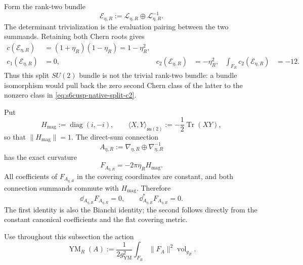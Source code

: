 Form the rank-two bundle
\begin{equation}\label{eq:s6cusp-native-split-bundle}
 \mathcal E_{\eta,R}:=
 \mathcal L_{\eta,R}\oplus\mathcal L_{\eta,R}^{-1}.
\end{equation}
The determinant trivialization is the evaluation pairing between the two
summands.  Retaining both Chern roots gives
\begin{align}
 c(\mathcal E_{\eta,R})
 &=(1+\eta_R)(1-\eta_R)=1-\eta_R^2,
 \label{eq:s6cusp-native-split-total-chern}\\
 c_1(\mathcal E_{\eta,R})&=0,
 &c_2(\mathcal E_{\eta,R})&=-\eta_R^2,
 &\int_{F_R}c_2(\mathcal E_{\eta,R})&=-12.
 \label{eq:s6cusp-native-split-c2}
\end{align}
Thus this split \(SU(2)\) bundle is not the trivial rank-two bundle: a bundle
isomorphism would pull back the zero second Chern class of the latter to the
nonzero class in \eqref{eq:s6cusp-native-split-c2}.

Put
\begin{equation}\label{eq:s6cusp-native-Hmag}
 H_{\mathrm{mag}}:=\operatorname{diag}(i,-i),
 \qquad
 \langle X,Y\rangle_{\mathfrak{su}(2)}
 :=-\frac12\operatorname{Tr}(XY),
\end{equation}
so that \(\lVert H_{\mathrm{mag}}\rVert=1\).  The direct-sum connection
\begin{equation}\label{eq:s6cusp-native-split-connection}
 A_{\eta,R}:=
 \nabla_{\eta,R}\oplus\nabla_{\eta,R}^{-1}
\end{equation}
has the exact curvature
\begin{equation}\label{eq:s6cusp-native-split-curvature}
 F_{A_{\eta,R}}=-2\pi\eta_RH_{\mathrm{mag}}.
\end{equation}
All coefficients of \(F_{A_{\eta,R}}\) in the covering coordinates are
constant, and both connection summands commute with
\(H_{\mathrm{mag}}\).  Therefore
\begin{equation}\label{eq:s6cusp-native-split-YM-equations}
 \dd_{A_{\eta,R}}F_{A_{\eta,R}}=0,
 \qquad
 \dd_{A_{\eta,R}}^*F_{A_{\eta,R}}=0.
\end{equation}
The first identity is also the Bianchi identity; the second follows directly
from the constant canonical coefficients and the flat covering metric.

Use throughout this subsection the action
\begin{equation}\label{eq:s6cusp-native-YM-action}
 \operatorname{YM}_R(A):=
 \frac1{2g_{\mathrm{YM}}^2}
 \int_{F_R}\lVert F_A\rVert^2\operatorname{vol}_{g_R}.
\end{equation}

